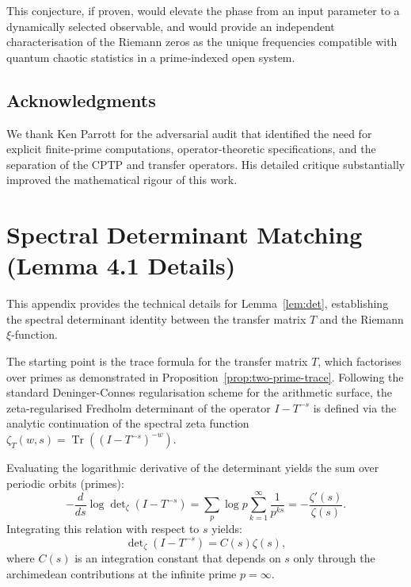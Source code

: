 \documentclass[11pt,a4paper]{article}
\begin{document}
This conjecture, if proven, would elevate the phase from an input parameter to a dynamically selected observable, and would provide an independent characterisation of the Riemann zeros as the unique frequencies compatible with quantum chaotic statistics in a prime‑indexed open system.

\subsection{Acknowledgments}
We thank Ken Parrott for the adversarial audit that identified the need for explicit finite‑prime computations, operator‑theoretic specifications, and the separation of the CPTP and transfer operators.  His detailed critique substantially improved the mathematical rigour of this work.


\section{Spectral Determinant Matching (Lemma 4.1 Details)}
\label{app:spectral_det}

This appendix provides the technical details for Lemma~\ref{lem:det}, establishing the spectral determinant identity between the transfer matrix $T$ and the Riemann $\xi$-function.

The starting point is the trace formula for the transfer matrix $T$, which factorises over primes as demonstrated in Proposition~\ref{prop:two-prime-trace}. Following the standard Deninger-Connes regularisation scheme for the arithmetic surface, the zeta-regularised Fredholm determinant of the operator $I - T^{-s}$ is defined via the analytic continuation of the spectral zeta function $\zeta_T(w, s) = \operatorname{Tr}((I - T^{-s})^{-w})$.

Evaluating the logarithmic derivative of the determinant yields the sum over periodic orbits (primes):
\begin{equation}
-\frac{d}{ds} \log \det\nolimits_{\zeta}(I - T^{-s}) = \sum_p \log p \sum_{k=1}^\infty \frac{1}{p^{ks}} = -\frac{\zeta'(s)}{\zeta(s)}.
\end{equation}
Integrating this relation with respect to $s$ yields:
\begin{equation}
\det\nolimits_{\zeta}(I - T^{-s}) = C(s) \zeta(s),
\end{equation}
where $C(s)$ is an integration constant that depends on $s$ only through the archimedean contributions at the infinite prime $p=\infty$.
\end{document}
